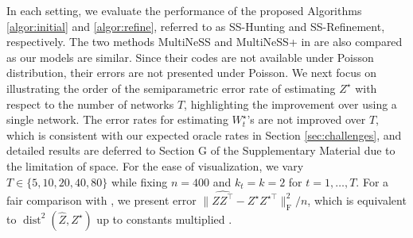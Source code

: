 \documentclass[12pt]{article}
\newcommand{\blue}[1]{\textcolor{blue}{#1}}
\newcommand{\mytrans}{\top}
\begin{document}
In each setting, we evaluate the performance of the proposed Algorithms \ref{algor:initial} and \ref{algor:refine}, referred to as SS-Hunting and SS-Refinement, respectively.
The two methods MultiNeSS and   MultiNeSS+ in \cite{macdonald2022latent} are also compared  as our models are similar. 
 Since their codes are not available under Poisson distribution, their errors are not presented under Poisson.   
We next focus on illustrating the order of the semiparametric error rate of estimating $Z^{\star}$ with respect to the number of networks $T$, highlighting the improvement over using a single network. %
The error rates for estimating $W_t^{\star}$'s are not improved over $T$, which is consistent with our expected oracle rates in Section \ref{sec:challenges}, and detailed results are deferred to Section G of the Supplementary Material due to the limitation of space. 
For the ease of visualization, we vary $T \in \{5, 10, 20, 40, 80\}$ while fixing $n = 400$ and  $k_t = k = 2$ for $t=1,\ldots, T$. 
For a fair comparison with \cite{macdonald2022latent}, we present error  $\|\widehat{ZZ^\mytrans} - Z^\star Z^{\star \mytrans}\|_{\mathrm{F}}^2/n$, which is equivalent to $\operatorname{dist}^2(\hat Z, Z^\star)$ up to constants multiplied \citep{tu2016low}.  
\end{document}

